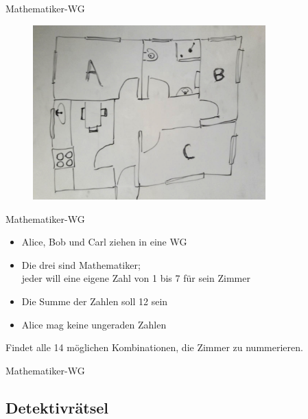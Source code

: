 \documentclass{beamer}
\begin{document}
\begin{frame}{Mathematiker-WG}
	\begin{figure}
		\includegraphics[width=0.8\textwidth]{images/mathematiker-wg}
	\end{figure}
\end{frame}

\begin{frame}{Mathematiker-WG}
	\begin{itemize}
		\item Alice, Bob und Carl ziehen in eine WG
		\item Die drei sind Mathematiker;\\jeder will eine eigene Zahl von 1 bis 7 für sein Zimmer
		\item Die Summe der Zahlen soll 12 sein
		\item Alice mag keine ungeraden Zahlen
	\end{itemize}

	Findet alle 14 möglichen Kombinationen, die Zimmer zu nummerieren.
\end{frame}

\begin{frame}{Mathematiker-WG}
\end{frame}

\subsection{Detektivrätsel}
\end{document}
